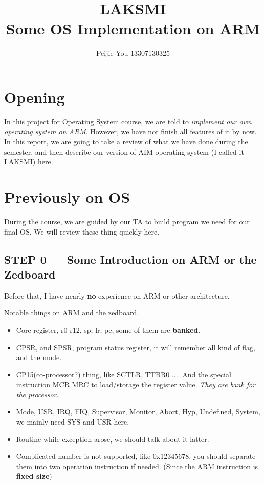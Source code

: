 \documentclass{article}
\title{LAKSMI\\Some OS Implementation on ARM}
\author{Peijie You 13307130325}
\begin{document}
\maketitle
\tableofcontents
\newpage

\section{Opening}

In this project for Operating System course, we are told to \emph{implement our own operating system on ARM}. However, we have not finish all features of it by now. In this report, we are going to take a review of what we have done during the semester, and then describe our version of AIM operating system (I called it LAKSMI) here.

\section{Previously on OS}

During the course, we are guided by our TA to build program we need for our final OS. We will review these thing quickly here.

\subsection{STEP 0 --- Some Introduction on ARM or the Zedboard}

Before that, I have nearly \textbf{no} experience on ARM or other architecture.

Notable things on ARM and the zedboard.
\begin{itemize}
	\item	Core register, r0-r12, sp, lr, pc, some of them are \textbf{banked}.
	\item CPSR, and SPSR, program status register, it will remember all kind of flag, and the mode.
	\item	CP15(co-processor?) thing, like SCTLR, TTBR0 .... And the special instruction MCR MRC to load/storage the register value. \emph{They are bank for the processor}.
	\item	Mode, USR, IRQ, FIQ, Supervisor, Monitor, Abort, Hyp, Undefined, System, we mainly need SYS and USR here.
	\item	Routine while exception arose, we should talk about it latter.
	\item	Complicated number is not supported, like 0x12345678, you should separate them into two operation instruction if needed. (Since the ARM instruction is \textbf{fixed size})
\end{itemize}
\end{document}
